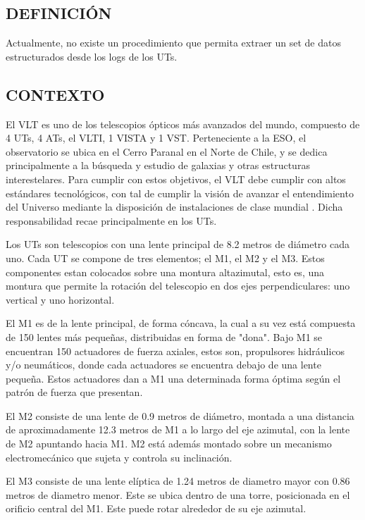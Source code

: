 
\subsection{DEFINICIÓN}

Actualmente, no existe un procedimiento que permita extraer un set de datos estructurados desde los logs de los UTs.

\subsection{CONTEXTO}

El VLT es uno de los telescopios ópticos más avanzados del mundo, compuesto de 4 UTs, 4 ATs, el VLTI, 1 VISTA y 1 VST\cite{eso2023paranal}.
Perteneciente a la ESO, el observatorio se ubica en el Cerro Paranal en el Norte de Chile, y se dedica principalmente a la búsqueda y estudio de galaxias y otras estructuras interestelares\cite{eso1998vlt}.
Para cumplir con estos objetivos, el VLT debe cumplir con altos estándares tecnológicos, con tal de cumplir la visión de avanzar el entendimiento del Universo mediante la disposición de instalaciones de clase mundial \cite{eso1998vlt}. Dicha responsabilidad recae principalmente en los UTs.

Los UTs son telescopios con una lente principal de 8.2 metros de diámetro cada uno. Cada UT se compone de tres elementos; el M1, el M2 y el M3. Estos componentes estan colocados sobre una montura altazimutal, esto es, una montura que permite la rotación del telescopio en dos ejes perpendiculares: uno vertical y uno horizontal.\cite{eso2011m2}

El M1 es de la lente principal, de forma cóncava, la cual a su vez está compuesta de 150 lentes más pequeñas, distribuidas en forma de "dona".
Bajo M1 se encuentran 150 actuadores de fuerza axiales, estos son, propulsores hidráulicos y/o neumáticos, donde cada actuadores se encuentra debajo de una lente pequeña.
Estos actuadores dan a M1 una determinada forma óptima según el patrón de fuerza que presentan\cite{eso1998vlt}.

El M2 consiste de una lente de 0.9 metros de diámetro, montada a una distancia de aproximadamente 12.3 metros de M1 a lo largo del eje azimutal, con la lente de M2 apuntando hacia M1.
M2 está además montado sobre un mecanismo electromecánico que sujeta y controla su inclinación\cite{eso2011m2}. 

El M3 consiste de una lente elíptica de 1.24 metros de diametro mayor con 0.86 metros de diametro menor. Este se ubica dentro de una torre, posicionada en el orificio central del M1.
Este puede rotar alrededor de su eje azimutal\cite{eso2011m1}.

